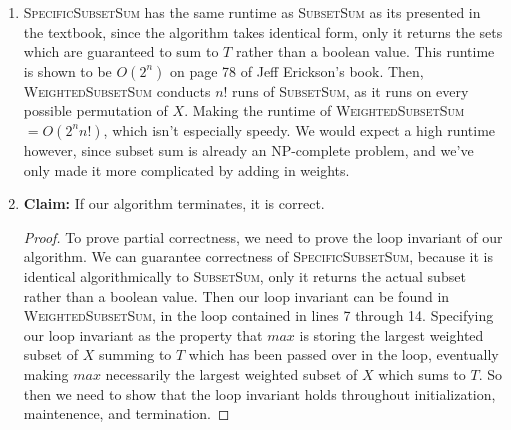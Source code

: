\documentclass{article}
\begin{document}
\begin{enumerate}
\begin{algorithm}
\begin{algorithmic}[1]
                \end{algorithmic}
                \end{algorithm}

		\begin{algorithm}\caption{\textsc{WeightedSubsetSum}($X$, $W$, $T$)}\label{alg:sss}
                        {\bf Input:} A set $X$ with corresponding weights $W$, and a positive integer $T$\\
                        {\bf Output:} Return the maximally weighted subset of $X$ which sums to $T$ if any exist. 
			If not, return $-\infty$.
                \begin{algorithmic}[1]
			\State $X^*_1, ... , X^*_{|X|!} \gets$ All possible permutations of $X$
			\State $W^*_1, ..., W^*_{|X|!} \gets$ the corresponding weights to all permutations of $X$
			\State $i \gets 1$
			\State $n \gets |X|$
			\State $max \gets \{-\infty\}$
			\State $maxVal \gets -\infty$
				\State $current \gets$ \textsc{SpecificSubsetSum}($X^*_i, \emptyset, W^*_i, |X^*_i|, T$)
				\State $currentVal \gets W_{current}[1] + ... + W_{current}[|W_{current}|]$
					\State $maxVal \gets currentVal$
					\State $max \gets current$
				\EndIf
			\EndFor
			\State \Return $max$

		\end{algorithmic}
		\end{algorithm}

	\item
		\textsc{SpecificSubsetSum} has the same runtime as \textsc{SubsetSum} as its presented in the textbook,
		since the algorithm takes identical form, only it returns the sets which are guaranteed to sum to $T$
		rather than a boolean value. This runtime is shown to be $O(2^n)$ on page 78 of Jeff Erickson's book.
		Then, \textsc{WeightedSubsetSum} conducts $n!$ runs of \textsc{SubsetSum}, as it runs on every possible
		permutation of $X$. Making the runtime of \textsc{WeightedSubsetSum} $=O(2^nn!)$, which isn't especially
		speedy. We would expect a high runtime however, since subset sum is already an NP-complete problem,
		and we've only made it more complicated by adding in weights.
	\item
		\textbf{Claim:} If our algorithm terminates, it is correct.
		\begin{proof}
			To prove partial correctness, we need to prove the loop invariant of our algorithm. We can
			guarantee correctness of \textsc{SpecificSubsetSum}, because it is identical algorithmically to
			\textsc{SubsetSum}, only it returns the actual subset rather than a boolean value. Then our loop
			invariant can be found in \textsc{WeightedSubsetSum}, in the loop contained in lines 7 through 14.
			Specifying our loop invariant as the property that $max$ is storing the largest weighted subset 
			of $X$ summing to $T$ which has been passed over in the loop, eventually making $max$ necessarily 
			the largest weighted subset of $X$ which sums to $T$. So then we need to show that the loop 
			invariant holds throughout initialization, maintenence, and termination.


\end{proof}
\end{enumerate}
\end{document}
